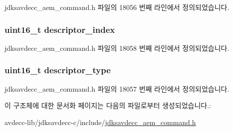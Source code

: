 jdksavdecc\+\_\+aem\+\_\+command.\+h 파일의 18056 번째 라인에서 정의되었습니다.

\subsubsection[{\texorpdfstring{descriptor\+\_\+index}{descriptor_index}}]{\setlength{\rightskip}{0pt plus 5cm}uint16\+\_\+t descriptor\+\_\+index}\hypertarget{structjdksavdecc__aem__command__increment__control__response_a042bbc76d835b82d27c1932431ee38d4}{}\label{structjdksavdecc__aem__command__increment__control__response_a042bbc76d835b82d27c1932431ee38d4}


jdksavdecc\+\_\+aem\+\_\+command.\+h 파일의 18058 번째 라인에서 정의되었습니다.

\subsubsection[{\texorpdfstring{descriptor\+\_\+type}{descriptor_type}}]{\setlength{\rightskip}{0pt plus 5cm}uint16\+\_\+t descriptor\+\_\+type}\hypertarget{structjdksavdecc__aem__command__increment__control__response_ab7c32b6c7131c13d4ea3b7ee2f09b78d}{}\label{structjdksavdecc__aem__command__increment__control__response_ab7c32b6c7131c13d4ea3b7ee2f09b78d}


jdksavdecc\+\_\+aem\+\_\+command.\+h 파일의 18057 번째 라인에서 정의되었습니다.



이 구조체에 대한 문서화 페이지는 다음의 파일로부터 생성되었습니다.\+:\begin{DoxyCompactItemize}
\item 
avdecc-\/lib/jdksavdecc-\/c/include/\hyperlink{jdksavdecc__aem__command_8h}{jdksavdecc\+\_\+aem\+\_\+command.\+h}\end{DoxyCompactItemize}
